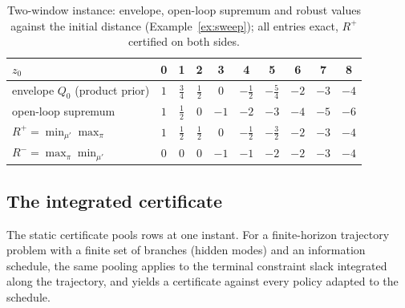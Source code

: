\documentclass[11pt,a4paper]{article}
\theoremstyle{plain}
\theoremstyle{definition}
\theoremstyle{remark}
\newcommand{\tfr}[2]{\tfrac{#1}{#2}}
\begin{document}
\begin{table}[t]
\centering\small
\caption{Two-window instance: envelope, open-loop supremum and robust values against the initial distance (Example~\ref{ex:sweep}); all entries exact, $R^+$ certified on both sides.}
\label{tab:sweep}
\begin{tabular}{lccccccccc}
\toprule
$z_0$ & 0 & 1 & 2 & 3 & 4 & 5 & 6 & 7 & 8\\
\midrule
envelope $Q_0$ (product prior) & $1$ & $\tfr34$ & $\tfr12$ & $0$ & $-\tfr12$ & $-\tfr54$ & $-2$ & $-3$ & $-4$\\
open-loop supremum & $1$ & $\tfr12$ & $0$ & $-1$ & $-2$ & $-3$ & $-4$ & $-5$ & $-6$\\
$R^+=\min_{\mu'}\max_\pi$ & $1$ & $\tfr12$ & $\tfr12$ & $0$ & $-\tfr12$ & $-\tfr32$ & $-2$ & $-3$ & $-4$\\
$R^-=\max_\pi\min_{\mu'}$ & $0$ & $0$ & $0$ & $-1$ & $-1$ & $-2$ & $-2$ & $-3$ & $-4$\\
\bottomrule
\end{tabular}
\end{table}

\subsection{The integrated certificate}\label{sec:integrated}

The static certificate pools rows at one instant. For a finite-horizon trajectory problem with a finite set of branches (hidden modes) and an information schedule, the same pooling applies to the terminal constraint slack integrated along the trajectory, and yields a certificate against every policy adapted to the schedule.
\end{document}
